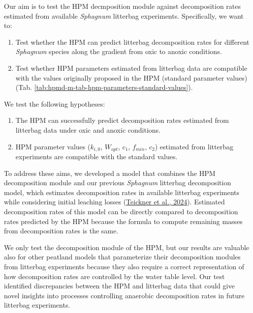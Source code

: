 \documentclass[
  12pt,
]{article}
\begin{document}
Our aim is to test the HPM decmposition module against decomposition rates estimated from available \emph{Sphagnum} litterbag experiments. Specifically, we want to:

\begin{enumerate}
\def\labelenumi{\arabic{enumi}.}
\item
  Test whether the HPM can predict litterbag decomposition rates for different \emph{Sphagnum} species along the gradient from oxic to anoxic conditions.
\item
  Test whether HPM parameters estimated from litterbag data are compatible with the values originally proposed in the HPM (standard parameter values) (Tab. \ref{tab:hpmd-m-tab-hpm-parameters-standard-values}).
\end{enumerate}

We test the following hypotheses:

\begin{enumerate}
\def\labelenumi{\arabic{enumi}.}
\item
  The HPM can successfully predict decomposition rates estimated from litterbag data under oxic and anoxic conditions.
\item
  HPM parameter values (\(k_{i,0}\), \(W_{opt}\), \(c_1\), \(f_{min}\), \(c_2\)) estimated from litterbag experiments are compatible with the standard values.
\end{enumerate}

To address these aims, we developed a model that combines the HPM decomposition module and our previous \emph{Sphagnum} litterbag decomposition model, which estimates decomposition rates in available litterbag experiments while considering initial leaching losses (\protect\hyperlink{ref-Teickner.2024}{Teickner et al., 2024}). Estimated decomposition rates of this model can be directly compared to decomposition rates predicted by the HPM because the formula to compute remaining masses from decomposition rates is the same.

We only test the decomposition module of the HPM, but our results are valuable also for other peatland models that parameterize their decomposition modules from litterbag experiments because they also require a correct representation of how decomposition rates are controlled by the water table level. Our test identified discrepancies between the HPM and litterbag data that could give novel insights into processes controlling anaerobic decomposition rates in future litterbag experiments.\\
\end{document}
